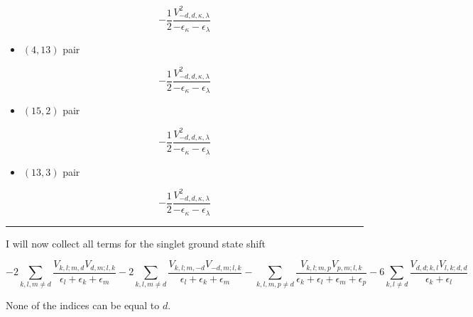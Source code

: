 \documentclass[
  letterpaper,
  DIV=11,
  numbers=noendperiod]{scrartcl}
\providecommand{\tightlist}{%
  \setlength{\itemsep}{0pt}\setlength{\parskip}{0pt}}
\begin{document}
\begin{equation}
-\frac{1}{2}\frac{V_{-d,d,\kappa ,\lambda }^2}{-\epsilon _{\kappa }-\epsilon _{\lambda }}
\end{equation}

\begin{itemize}
\tightlist
\item
  \((4,13)\) pair
\end{itemize}

\begin{equation}
-\frac{1}{2}\frac{V_{-d,d,\kappa ,\lambda }^2}{-\epsilon _{\kappa }-\epsilon _{\lambda }}
\end{equation}

\begin{itemize}
\tightlist
\item
  \((15,2)\) pair
\end{itemize}

\begin{equation}
-\frac{1}{2}\frac{V_{-d,d,\kappa ,\lambda }^2}{-\epsilon _{\kappa }-\epsilon _{\lambda }}
\end{equation}

\begin{itemize}
\tightlist
\item
  \((13,3)\) pair
\end{itemize}

\begin{equation}
-\frac{1}{2}\frac{V_{-d,d,\kappa ,\lambda }^2}{-\epsilon _{\kappa }-\epsilon _{\lambda }}
\end{equation}

\begin{center}\rule{0.5\linewidth}{0.5pt}\end{center}

I will now collect all terms for the singlet ground state shift

\begin{tcolorbox}[enhanced jigsaw, arc=.35mm, bottomrule=.15mm, bottomtitle=1mm, breakable, colback=white, colbacktitle=quarto-callout-note-color!10!white, colframe=quarto-callout-note-color-frame, coltitle=black, left=2mm, leftrule=.75mm, opacityback=0, opacitybacktitle=0.6, rightrule=.15mm, title=\textcolor{quarto-callout-note-color}{\faInfo}\hspace{0.5em}{Spin singlet 2nd-order shift}, titlerule=0mm, toprule=.15mm, toptitle=1mm]

\begin{equation}
\boxed{
-2\sum_{k,l,m\ne d}\frac{V_{k,l;m,d}V_{d,m;l,k}}{\epsilon_{l}+\epsilon_{k}+\epsilon_m}
-2\sum_{k,l,m\ne d}\frac{V_{k,l;m,-d}V_{-d,m;l,k}}{\epsilon_{l}+\epsilon_{k}+\epsilon_m}
-\sum_{k,l,m,p\ne d}\frac{V_{k,l;m,p}V_{p,m;l,k}}{\epsilon_{k}+\epsilon_{l}+\epsilon_m+\epsilon_p}
-6\sum_{k,l\ne d}\frac{V_{d,d;k,l}V_{l,k;d,d}}{\epsilon_{k}+\epsilon_{l}}
}
\end{equation}

None of the indices can be equal to \(d\).

\end{tcolorbox}
\end{document}
